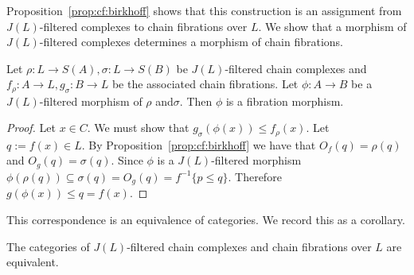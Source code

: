 Proposition~\ref{prop:cf:birkhoff} shows that this construction is an assignment from $J(L)$-filtered complexes to chain fibrations over $L$.     We show that a morphism of $J(L)$-filtered complexes determines a morphism of chain fibrations.  

\begin{prop}
Let $\rho:L\to S(A),\sigma:L\to S(B)$ be $J(L)$-filtered chain complexes and $f_\rho:A\to L, g_\sigma:B\to L$ be the associated chain fibrations.  Let $\phi:A\to B$ be a $J(L)$-filtered morphism of $\rho$ and$ \sigma$.  Then $\phi$ is a fibration morphism.
\end{prop}
\begin{proof}
Let $x\in C$.  We must show that $g_\sigma(\phi(x))\leq f_\rho(x)$.  Let $q:= f(x)\in L$.  By Proposition~\ref{prop:cf:birkhoff} we have that $O_f(q) = \rho(q)$ and $O_g(q) = \sigma(q)$.   Since $\phi$ is a $J(L)$-filtered morphism $\phi(\rho(q))\subseteq \sigma(q) = O_g(q)=f^{-1}\{p\leq q\}$. Therefore $g(\phi(x))\leq q = f(x)$.
\end{proof}





 

This correspondence is an equivalence of categories.  We record this as a corollary.

\begin{cor}
The categories of $J(L)$-filtered chain complexes and chain fibrations over $L$ are equivalent.
\end{cor}

















 
